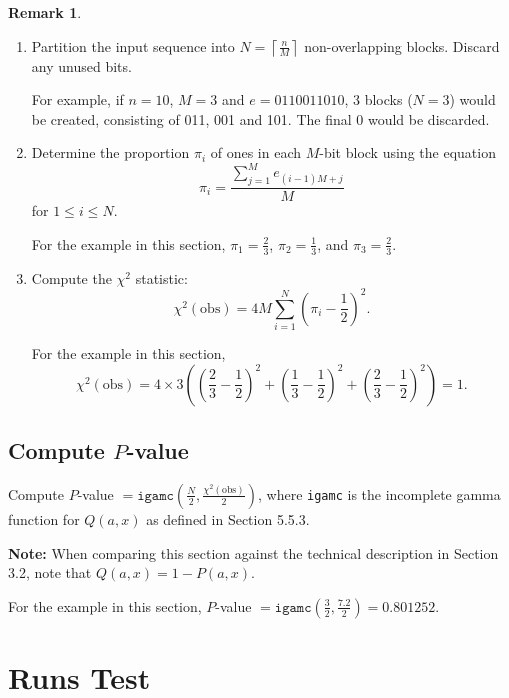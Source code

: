 \documentclass[12pt,openany]{book}
\theoremstyle{definition}
\newtheorem{remark}{Remark}[chapter]
\begin{document}
	\begin{remark}
		\begin{enumerate}
			\item Partition the input sequence into \(N = \left\lceil \frac{n}{M} \right\rceil\) non-overlapping blocks. Discard any unused bits.
			
			For example, if \(n = 10\), \(M = 3\) and \(e = 0110011010\), 3 blocks (\(N = 3\)) would be created, consisting of 011, 001 and 101. The final 0 would be discarded.
			
			\item Determine the proportion \(\pi_i\) of ones in each \(M\)-bit block using the equation
			\[
			\pi_i = \frac{\sum_{j=1}^{M} e_{(i-1)M+j}}{M}
			\]
			for \(1 \leq i \leq N\).
			
			For the example in this section, \(\pi_1 = \frac{2}{3}\), \(\pi_2 = \frac{1}{3}\), and \(\pi_3 = \frac{2}{3}\).
			
			\item Compute the \(\chi^2\) statistic: 
			\[
			\chi^2(\text{obs}) = 4M \sum_{i=1}^{N} \left(\pi_i - \frac{1}{2}\right)^2.
			\]
			
			For the example in this section, 
			\[
			\chi^2(\text{obs}) = 4 \times 3 \left(\left(\frac{2}{3} - \frac{1}{2}\right)^2 + \left(\frac{1}{3} - \frac{1}{2}\right)^2 + \left(\frac{2}{3} - \frac{1}{2}\right)^2\right) = 1.
			\]
		\end{enumerate}
	\end{remark}
	
	

	\subsection*{Compute \( P \)-value}
	Compute \( P \)-value \( = \texttt{igamc} \left( \frac{N}{2}, \frac{\chi^2(\text{obs})}{2} \right) \), where \texttt{igamc} is the incomplete gamma function for \( Q(a,x) \) as defined in Section 5.5.3.
	
	\textbf{Note:} When comparing this section against the technical description in Section 3.2, note that \( Q(a,x) = 1 - P(a,x) \).
	
	For the example in this section, \( P \)-value \( = \texttt{igamc} \left( \frac{3}{2}, \frac{7.2}{2} \right) = 0.801252 \).

\newpage
	\section{Runs Test}
	
\end{document}
